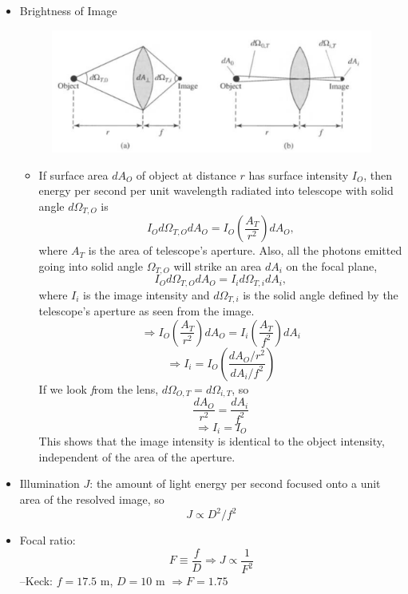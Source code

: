\documentclass[12pt]{article}
\begin{document}
\begin{itemize}
\item Brightness of Image
\begin{figure}[h!]
\centering
\includegraphics[width=5in]{CandOfigs/objectandimagesolidangles.png}
\end{figure}
\begin{itemize}
\item If surface area $dA_O$ of object at distance $r$ has surface intensity $I_O$, then energy per second per unit wavelength radiated into telescope with solid angle $d\Omega_{T,O}$ is
\begin{equation}
I_O d\Omega_{T,O} dA_O = I_O\left(\frac{A_T}{r^2}\right)dA_O,
\end{equation}
where $A_T$ is the area of telescope's aperture. Also, all the photons emitted going into solid angle $\Omega_{T,O}$ will strike an area $dA_{i}$ on the focal plane, 
\begin{equation}
I_O d\Omega_{T,O} dA_O = I_i d\Omega_{T,i} dA_{i},
\end{equation}
where $I_i$ is the image intensity and $d\Omega_{T,i}$ is the solid angle defined by the telescope's aperture as seen from the image.
\begin{equation}
\Longrightarrow  I_O\left(\frac{A_T}{r^2}\right)dA_O = I_i\left(\frac{A_T}{f^2}\right)dA_i
\end{equation}
\begin{equation}
\Longrightarrow I_i = I_O\left(\frac{dA_O/r^2}{dA_i/f^2}\right)
\end{equation}
If we look {\textit from} the lens, $d\Omega_{O,T} = d\Omega_{i,T}$, so 
\begin{equation}
\frac{dA_O}{r^2} = \frac{d A_i}{f^2}
\end{equation}
\begin{equation}
\Longrightarrow I_i = I_O
\end{equation}
This shows that the image intensity is identical to the object intensity, independent of the area of the aperture.
\end{itemize}
\item Illumination $J$: the amount of light energy per second focused onto a unit area of the resolved image, so 
\begin{equation}
J \propto D^2/f^2
\end{equation}
\item Focal ratio:
\begin{equation}
F \equiv \frac{f}{D} \Longrightarrow J \propto	\frac{1}{F^2}
\end{equation}
--Keck: $f = 17.5\text{ m}$, $D = 10\text{ m}$ $\Longrightarrow F = 1.75$


\end{itemize}
\end{document}

